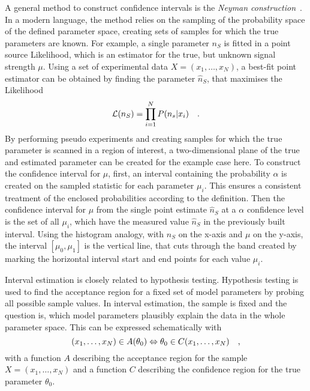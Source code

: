 A general method to construct confidence intervals is the \emph{Neyman construction} \cite{Neyman:1937cls}.
In a modern language, the method relies on the sampling of the probability space of the defined parameter space, creating sets of samples for which the true parameters are known.
For example, a single parameter $n_S$ is fitted in a point source Likelihood, which is an estimator for the true, but unknown signal strength $\mu$.
Using a set of experimental data $X=(x_1, \dots, x_N)$, a best-fit point estimator can be obtained by finding the parameter $\hat{n}_S$, that maximises the Likelihood
\begin{equation}
  \mathcal{L}(n_S) = \prod_{i=1}^N P(n_s|x_i)
  \quad\text{.}
\end{equation}
By performing pseudo experiments and creating samples for which the true parameter is scanned in a region of interest, a two-dimensional plane of the true and estimated parameter can be created for the example case here.
To construct the confidence interval for $\mu$, first, an interval containing the probability $\alpha$ is created on the sampled statistic for each parameter $\mu_i$.
This ensures a consistent treatment of the enclosed probabilities according to the definition.
Then the confidence interval for $\mu$ from the single point estimate $\hat{n}_S$ at a $\alpha$ confidence level is the set of all $\mu_i$, which have the measured value $\hat{n}_S$ in the previously built interval.
Using the histogram analogy, with $n_S$ on the x-axis and $\mu$ on the y-axis, the interval $[\mu_0, \mu_1]$ is the vertical line, that cuts through the band created by marking the horizontal interval start and end points for each value $\mu_i$.

Interval estimation is closely related to hypothesis testing.
Hypothesis testing is used to find the acceptance region for a fixed set of model parameters by probing all possible sample values.
In interval estimation, the sample is fixed and the question is, which model parameters plausibly explain the data in the whole parameter space.
This can be expressed schematically with
\begin{equation}
  (x_1, \dots, x_N) \in A(\theta_0)
  \Leftrightarrow
  \theta_0 \in C(x_1, \dots, x_N)
  \quad\text{,}
\end{equation}
with a function $A$ describing the acceptance region for the sample $X=(x_1, \dots, x_N)$ and a function $C$ describing the confidence region for the true parameter $\theta_0$.
